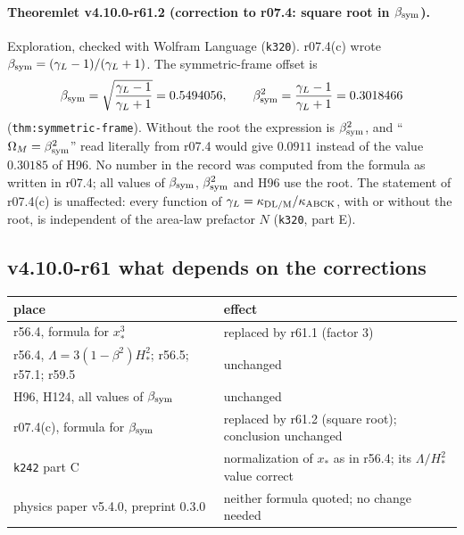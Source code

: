 \paragraph{Theoremlet v4.10.0-r61.2 (correction to r07.4: square root in \(\beta_{\rm sym}\)).}
Exploration, checked with Wolfram Language (\texttt{k320}).  r07.4(c) wrote \(\beta_{\rm sym}=(\gamma_L-1)/(\gamma_L+1)\).  The symmetric-frame
offset is
\[
\beta_{\rm sym}=\sqrt{\frac{\gamma_L-1}{\gamma_L+1}}=0.5494056,\qquad \beta_{\rm sym}^2=\frac{\gamma_L-1}{\gamma_L+1}=0.3018466
\]
(\texttt{thm:symmetric-frame}).  Without the root the expression is \(\beta_{\rm sym}^2\), and ``\(\Omega_M=\beta_{\rm sym}^2\)'' read literally from
r07.4 would give \(0.0911\) instead of the value \(0.30185\) of H96.  No number in the record was computed from the formula as written in r07.4;
all values of \(\beta_{\rm sym}\), \(\beta_{\rm sym}^2\) and H96 use the root.  The statement of r07.4(c) is unaffected: every function of
\(\gamma_L=\kappa_{\rm DL/M}/\kappa_{\rm ABCK}\), with or without the root, is independent of the area-law prefactor \(N\) (\texttt{k320}, part E).

\subsection*{v4.10.0-r61 what depends on the corrections}
\label{subsec:v4100-r61-impact}

\begin{center}
\small
\begin{tabular}{@{}>{\raggedright\arraybackslash}p{}>{\raggedright\arraybackslash}p{}@{}}
\toprule
place & effect\\
\midrule
r56.4, formula for \(x_*^3\) & replaced by r61.1 (factor 3)\\
r56.4, \(\Lambda=3(1-\beta^2)H_*^2\); r56.5; r57.1; r59.5 & unchanged\\
H96, H124, all values of \(\beta_{\rm sym}\) & unchanged\\
r07.4(c), formula for \(\beta_{\rm sym}\) & replaced by r61.2 (square root); conclusion unchanged\\
\texttt{k242} part C & normalization of \(x_*\) as in r56.4; its \(\Lambda/H_*^2\) value correct\\
physics paper v5.4.0, preprint 0.3.0 & neither formula quoted; no change needed\\
\bottomrule
\end{tabular}
\end{center}

